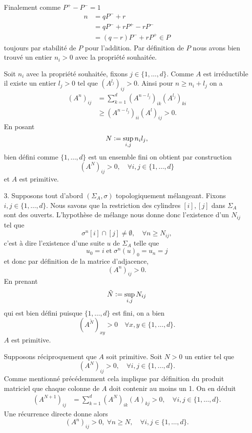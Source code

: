 \documentclass[12pt]{article}
\newcommand{\defeq}{\vcentcolon=}
\begin{document}
Finalement comme $P^{+}-P^{-} = 1$
\begin{align*}
        n &= qP^{-} + r \\
          &= qP^{-} +rP^{+} - rP^{-} \\
          &= (q-r)P^{-} + rP^{+} \in P
\end{align*} toujours par stabilité de $P$ pour l'addition. Par définition de $P$ nous avons bien trouvé un entier $n_{i} > 0$ avec la propriété souhaitée.

\medskip

Soit $n_{i}$ avec la propriété souhaitée, fixons $j \in \{1,\ldots,d\}$. Comme $A$ est irréductible il existe un entier $l_{j} > 0$ tel que $(A^{l_{j}})_{ij} > 0$. Ainsi pour $n \ge n_{i} + l_{j}$ on a
\begin{align*}
        (A^{n})_{ij} &= \sum_{k=1}^{d} (A^{n-l_{j}})_{ik}(A^{l_{j}})_{ki} \\
         &\ge (A^{n-l_{j}})_{ii}(A^{l})_{ij} > 0
.\end{align*} En posant \[
N \defeq \sup_{i,j} n_{i}l_{j}
,\] bien défini comme $\{1,\ldots,d\}$ est un ensemble fini on obtient par construction \[
(A^{N})_{ij} > 0, \quad \forall i,j \in \{1,\ldots,d\}  
\] et $A$ est primitive.

\bigskip

3. Supposons tout d'abord $(\Sigma_{A}, \sigma)$ topologiquement mélangeant. Fixons $i,j \in \{1,\ldots,d\}$. Nous savons que la restriction des cylindres $[i], [j]$ dans $\Sigma_{A}$ sont des ouverts. L'hypothèse de mélange nous donne donc l'existence d'un $N_{ij}$ tel que
\[
        \sigma^{n}[i] \cap [j] \neq \emptyset, \quad \forall n \ge N_{ij}
,\] c'est à dire l'existence d'une suite $u$ de $\Sigma_{A}$ telle que \[
u_{0} = i \; \text{et} \; \sigma^{n}(u)_{0} = u_{n} = j
\] et donc par définition de la matrice d'adjacence, \[
(A^{n})_{ij} > 0
.\] En prenant \[
\tilde{N} \defeq \sup_{i,j} N_{ij}
\] qui est bien défini puisque $\{1,\ldots,d\}$ est fini, on a bien \[
(A^{\tilde{N}})_{xy} > 0 \quad \forall x,y \in \{1,\ldots,d\} 
.\] $A$ est primitive.

\medskip

Supposons réciproquement que $A$ soit primitive. Soit $N > 0$ un entier tel que  \[
        (A^{N})_{ij} > 0, \quad \forall i,j \in \{1,\ldots,d\} 
.\] Comme mentionné précédemment cela implique par définition du produit matriciel que chaque colonne de $A$ doit contenir au moins un 1. On en déduit
\begin{align*}
        (A^{N+1})_{ij} &= \sum_{k=1}^{d} (A^{N})_{ik}(A)_{kj} > 0, \quad \forall i,j \in \{1,\ldots,d\} 
.\end{align*} Une récurrence directe donne alors \[
(A^{n})_{ij} > 0, \; \forall n \ge N, \quad \forall i,j \in \{1,\ldots,d\} 
.\] 
\end{document}
